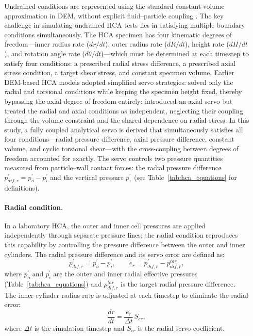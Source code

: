 Undrained conditions are represented using the standard constant-volume approximation in DEM, without explicit fluid--particle coupling \citep{YimsiriSoga2010}. The key challenge in simulating undrained HCA tests lies in satisfying multiple boundary conditions simultaneously. The HCA specimen has four kinematic degrees of freedom---inner radius rate ($dr/dt$), outer radius rate ($dR/dt$), height rate ($dH/dt$), and rotation angle rate ($d\theta/dt$)---which must be determined at each timestep to satisfy four conditions: a prescribed radial stress difference, a prescribed axial stress condition, a target shear stress, and constant specimen volume. Earlier DEM-based HCA models adopted simplified servo strategies: \citet{Han2024jgs} solved only the radial and torsional conditions while keeping the specimen height fixed, thereby bypassing the axial degree of freedom entirely; \citet{Ma2024} introduced an axial servo but treated the radial and axial conditions as independent, neglecting their coupling through the volume constraint and the shared dependence on radial stress. In this study, a fully coupled analytical servo is derived that simultaneously satisfies all four conditions---radial pressure difference, axial pressure difference, constant volume, and cyclic torsional shear---with the cross-coupling between degrees of freedom accounted for exactly. The servo controls two pressure quantities measured from particle--wall contact forces: the radial pressure difference $p_{dif,r}^{\prime}=p_o^{\prime}-p_i^{\prime}$ and the vertical pressure $p_z^{\prime}$ (see Table~\ref{tab:hca_equations} for definitions). 
\paragraph{Radial condition.}
In a laboratory HCA, the outer and inner cell pressures are applied independently through separate pressure lines; the radial condition reproduces this capability by controlling the pressure difference between the outer and inner cylinders. The radial pressure difference and its servo error are defined as:
\begin{equation}
p_{dif,r}^{\prime} = p_o^{\prime} - p_i^{\prime}, \qquad e_r = p_{dif,r}^{\prime} - p_{dif,r}^{tar},
\label{eq:cond1_radial}
\end{equation}
where $p_o^{\prime}$ and $p_i^{\prime}$ are the outer and inner radial effective pressures (Table~\ref{tab:hca_equations}) and $p_{dif,r}^{tar}$ is the target radial pressure difference. The inner cylinder radius rate is adjusted at each timestep to eliminate the radial error:
\begin{equation}
\frac{dr}{dt} = \frac{e_r}{\Delta t}\,S_{cr},
\label{eq:servo_radial}
\end{equation}
where $\Delta t$ is the simulation timestep and $S_{cr}$ is the radial servo coefficient.

